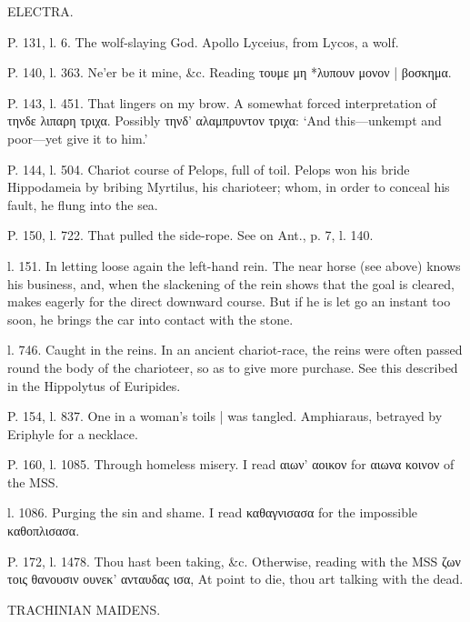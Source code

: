 \documentclass[11pt,letter]{book}
\begin{document}
\par  ELECTRA.

\par  P. 131, l. 6. The wolf-slaying God. Apollo Lyceius, from Lycos, a wolf.

\par  P. 140, l. 363. Ne’er be it mine, &c. Reading τουμε μη *λυπουν μονον | βοσκημα.

\par  [page 315]P. 143, l. 451. That lingers on my brow. A somewhat forced interpretation of τηνδε λιπαρη τριχα. Possibly τηνδ’ αλαμπρυντον τριχα: ‘And this—unkempt and poor—yet give it to him.’

\par  P. 144, l. 504. Chariot course of Pelops, full of toil. Pelops won his bride Hippodameia by bribing Myrtilus, his charioteer; whom, in order to conceal his fault, he flung into the sea.

\par  P. 150, l. 722. That pulled the side-rope. See on Ant., p. 7, l. 140.

\par  l. 151. In letting loose again the left-hand rein. The near horse (see above) knows his business, and, when the slackening of the rein shows that the goal is cleared, makes eagerly for the direct downward course. But if he is let go an instant too soon, he brings the car into contact with the stone.

\par  l. 746. Caught in the reins. In an ancient chariot-race, the reins were often passed round the body of the charioteer, so as to give more purchase. See this described in the Hippolytus of Euripides.

\par  P. 154, l. 837. One in a woman’s toils | was tangled. Amphiaraus, betrayed by Eriphyle for a necklace.

\par  P. 160, l. 1085. Through homeless misery. I read αιων’ αοικον for αιωνα κοινον of the MSS.

\par  l. 1086. Purging the sin and shame. I read καθαγνισασα for the impossible καθοπλισασα.

\par  P. 172, l. 1478. Thou hast been taking, &c. Otherwise, reading with the MSS ζων τοις θανουσιν ουνεκ’ ανταυδας ισα, At point to die, thou art talking with the dead.

\par  TRACHINIAN MAIDENS.
\end{document}
